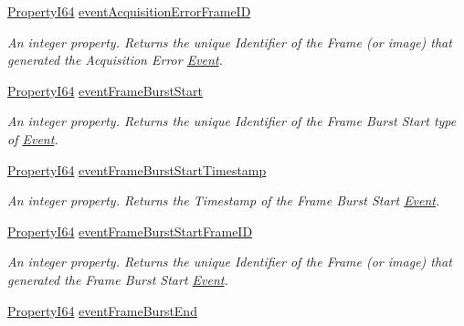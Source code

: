 \begin{DoxyCompactItemize}
\hyperlink{group___common_interface_ga81749b2696755513663492664a18a893}{Property\+I64} \hyperlink{classmv_i_m_p_a_c_t_1_1acquire_1_1_gen_i_cam_1_1_event_control_a2be10b8cf71668b4b5044237421bcb1d}{event\+Acquisition\+Error\+Frame\+I\+D}
\begin{DoxyCompactList}\small\item\em An integer property. Returns the unique Identifier of the Frame (or image) that generated the Acquisition Error \hyperlink{classmv_i_m_p_a_c_t_1_1acquire_1_1_event}{Event}. \end{DoxyCompactList}\item 
\hyperlink{group___common_interface_ga81749b2696755513663492664a18a893}{Property\+I64} \hyperlink{classmv_i_m_p_a_c_t_1_1acquire_1_1_gen_i_cam_1_1_event_control_aeeda3c35dc059f2bbb55e49ba4b6657e}{event\+Frame\+Burst\+Start}
\begin{DoxyCompactList}\small\item\em An integer property. Returns the unique Identifier of the Frame Burst Start type of \hyperlink{classmv_i_m_p_a_c_t_1_1acquire_1_1_event}{Event}. \end{DoxyCompactList}\item 
\hyperlink{group___common_interface_ga81749b2696755513663492664a18a893}{Property\+I64} \hyperlink{classmv_i_m_p_a_c_t_1_1acquire_1_1_gen_i_cam_1_1_event_control_a204ef5131e625d290ba04a3cc8fdd5db}{event\+Frame\+Burst\+Start\+Timestamp}
\begin{DoxyCompactList}\small\item\em An integer property. Returns the Timestamp of the Frame Burst Start \hyperlink{classmv_i_m_p_a_c_t_1_1acquire_1_1_event}{Event}. \end{DoxyCompactList}\item 
\hyperlink{group___common_interface_ga81749b2696755513663492664a18a893}{Property\+I64} \hyperlink{classmv_i_m_p_a_c_t_1_1acquire_1_1_gen_i_cam_1_1_event_control_abf62c2851af7370c1943577fca87b331}{event\+Frame\+Burst\+Start\+Frame\+I\+D}
\begin{DoxyCompactList}\small\item\em An integer property. Returns the unique Identifier of the Frame (or image) that generated the Frame Burst Start \hyperlink{classmv_i_m_p_a_c_t_1_1acquire_1_1_event}{Event}. \end{DoxyCompactList}\item 
\hyperlink{group___common_interface_ga81749b2696755513663492664a18a893}{Property\+I64} \hyperlink{classmv_i_m_p_a_c_t_1_1acquire_1_1_gen_i_cam_1_1_event_control_a1d76b2f0b911311921244cc981b3e9bd}{event\+Frame\+Burst\+End}

\end{DoxyCompactItemize}
